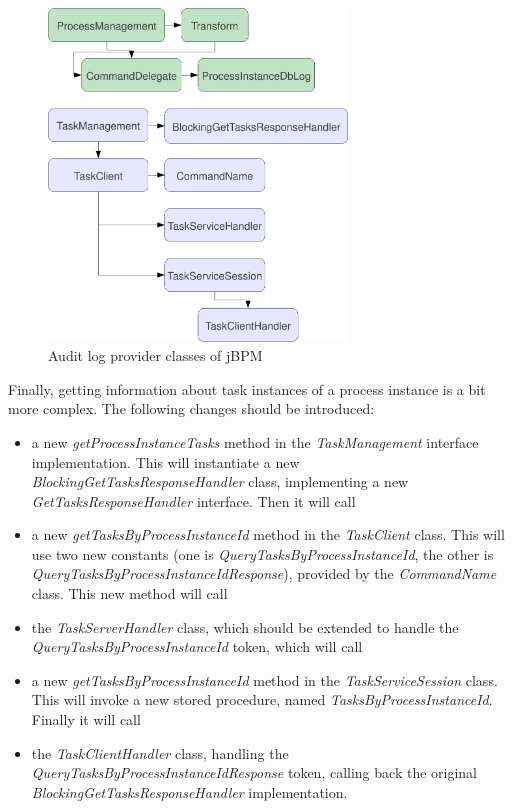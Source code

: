 \begin{figure}[p]
\centering
\includegraphics[width=300px,keepaspectratio]{jbpm-modified-classes.pdf}
\caption{Audit log provider classes of jBPM}
\label{fig:jbpm-modified-classes}
\end{figure}

Finally, getting information about task instances of a process instance is a
bit more complex. The following changes should be introduced:

\begin{itemize}
\item a new \emph{getProcessInstanceTasks} method in the \emph{TaskManagement}
	interface implementation. This will instantiate a new
	\emph{BlockingGetTasksResponseHandler} class, implementing a new
	\emph{GetTasksResponseHandler} interface. Then it will call
\item a new \emph{getTasksByProcessInstanceId} method in the \emph{TaskClient} class. This will use two new constants (one is \emph{QueryTasksByProcessInstanceId}, the other is \emph{QueryTasksByProcessInstanceIdResponse}), provided by the \emph{CommandName} class. This new method will call
\item the \emph{TaskServerHandler} class, which should be extended to handle the \emph{QueryTasksByProcessInstanceId} token, which will call
\item a new \emph{getTasksByProcessInstanceId} method in the \emph{TaskServiceSession} class. This will invoke a new stored procedure, named \emph{TasksByProcessInstanceId}. Finally it will call
\item the \emph{TaskClientHandler} class, handling the \emph{QueryTasksByProcessInstanceIdResponse} token, calling back the original \emph{BlockingGetTasksResponseHandler} implementation.
\end{itemize}


